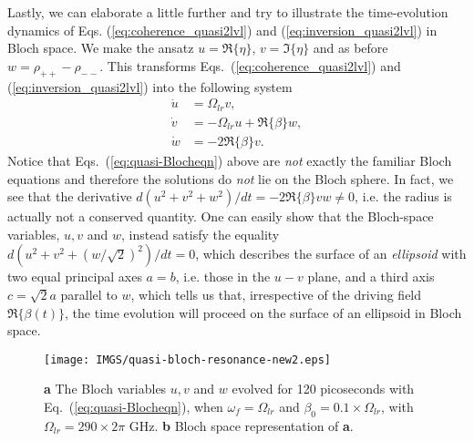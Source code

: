 \documentclass[reprint,secnumarabic,amssymb, nobibnotes, aip, prd]{revtex4-1}
\newcommand{\vspacec}{\vspace{-0.3cm}}
\begin{document}
\vspacec
Lastly, we can elaborate a little further and try to illustrate the time-evolution dynamics of Eqs. (\ref{eq:coherence_quasi2lvl}) and (\ref{eq:inversion_quasi2lvl}) in Bloch space. We make the ansatz $u=\Re\{\eta\}$, $v =\Im\{\eta\}$ and as before $w = \rho_{++}-\rho_{--}$. This transforms Eqs.~(\ref{eq:coherence_quasi2lvl}) and (\ref{eq:inversion_quasi2lvl}) into the following system 
\begin{subequations}
	\label{eq:quasi-Blocheqn}
	\begin{align}
		\dot{u} &= \Omega_{lr} v , \\
		\dot{v} &= -\Omega_{lr} u +\Re\{\beta\} w , \\
		\dot{w} &= -2\Re\{\beta\} v.
	\end{align}
\end{subequations}
 Notice that Eqs.~(\ref{eq:quasi-Blocheqn}) above are \emph{not} exactly the familiar Bloch equations and therefore the solutions do \emph{not} lie on the Bloch sphere. In fact, we see that the derivative $d(u^2+v^2+w^2)/dt = -2\Re\{\beta\} vw \neq 0$, i.e. the radius is actually not a conserved quantity. One can easily show that the Bloch-space variables, $u,v $ and $w$, instead satisfy the equality $d(u^2+v^2+(w/\sqrt{2})^2)/dt = 0$, which describes the surface of an \emph{ellipsoid} with two equal principal axes $a=b$, i.e. those in the $u-v$ plane, and a third axis $c = \sqrt{2}a$ parallel to $w$, which tells us that, irrespective of the driving field $\Re\{\beta(t)\}$, the time evolution will proceed on the surface of an ellipsoid in Bloch space. 
\begin{figure}[h!]
	\begin{center}
		\texttt{[image: IMGS/quasi-bloch-resonance-new2.eps]}
		\caption{\textbf{a} The Bloch variables $u,v$ and $w$ evolved for 120 picoseconds with Eq.~(\ref{eq:quasi-Blocheqn}), when $\omega_f = \Omega_{lr}$ and $\beta_0 = 0.1\times\Omega_{lr}$, with $\Omega_{lr} = 290\times 2\pi$ GHz. \textbf{b} Bloch space representation of \textbf{a}.} \label{fig:quasi-bloch-resonance}
	\end{center}	
\end{figure}
\end{document}
